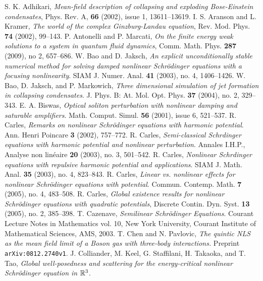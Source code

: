 \documentclass[a4paper,leqno]{amsart}
\theoremstyle{plain}
\theoremstyle{definition}
\numberwithin{equation}{section}
\begin{document}
\begin{thebibliography}{amsplain}

  S. K. Adhikari, \emph{Mean-field description of collapsing and exploding Bose-Einstein condensates}, Phys. Rev. A, {\bf 66} (2002), issue 1, 13611--13619.
 I. S. Aranson and L. Kramer, \emph{The world of the complex Ginzburg-Landau equation}, Rev. Mod. Phys. {\bf 74} (2002), 99--143.
 P. Antonelli and P. Marcati, \emph{On the finite energy weak solutions to a system in quantum fluid dynamics}, Comm. Math. Phys. {\bf 287} (2009), no 2, 657--686.
 W. Bao and D. Jaksch, \emph{An explicit unconditionally stable numerical method for solving damped nonlinear Schr\"odinger equations with a focusing nonlinearity}.
SIAM J. Numer. Anal. {\bf 41} (2003), no. 4, 1406--1426.
 W. Bao, D. Jaksch, and P. Markowich, \emph{Three dimensional simulation of jet formation in collapsing condensates}.
J. Phys. B: At. Mol. Opt. Phys. {\bf 37} (2004), no. 2, 329--343.
 E. A. Biswas, \emph{Optical soliton perturbation with nonlinear damping and saturable amplifiers}.
Math. Comput. Simul. {\bf 56} (2001), issue 6, 521--537.
  R. Carles, \emph{Remarks on nonlinear Schr\"odinger equations with harmonic potential}. Ann. Henri Poincare {\bf 3} (2002), 757--772.
 R. Carles, \emph{Semi-classical Schrdinger equations with harmonic potential and nonlinear perturbation}. Annales I.H.P., Analyse non lin\'eaire {\bf 20} (2003), no. 3, 501--542.
  R. Carles, \emph{Nonlinear Schrdinger equations with repulsive harmonic potential and applications}. SIAM J. Math. Anal. {\bf 35} (2003), no. 4, 823--843. 
  R. Carles, \emph{Linear vs. nonlinear effects for nonlinear Schr\"odinger equations with potential}.
Commun. Contemp. Math. {\bf 7} (2005), no. 4, 483--508.
  R. Carles, \emph{Global existence results for nonlinear Schr\"odinger equations with quadratic potentials}, Discrete Contin. Dyn. Syst. {\bf 13} (2005), no. 2, 385--398.
 T. Cazenave, \emph{Semilinear Schr\"odinger Equations}.
Courant Lecture Notes in Mathematics vol. 10, New York University, Courant Institute of Mathematical Sciences, AMS, 2003.
 T. Chen and  N. Pavlovic, \emph{The quintic NLS as the mean field limit of a Boson gas with three-body interactions.}
Preprint {\tt arXiv:0812.2740v1}.
 J. Colliander, M. Keel, G. Staffilani, H. Takaoka, and T. Tao, \emph{Global well-posedness and scattering for the energy-critical nonlinear Schr\"odinger equation in $\Bbb R\sp 3$}.

\end{thebibliography}
\end{document}

